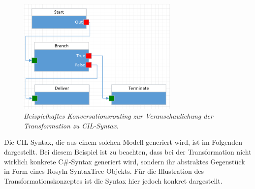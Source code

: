 \newpage

\begin{figure} %
	\centering
		\includegraphics[width=0.7\textwidth]{img/FlowToCodeExample.png}
	\caption[Beispielhaftes Konversationsrouting zur Veranschaulichung der Transformation zu CIL-Syntax]{\textit{Beispielhaftes Konversationsrouting zur Veranschaulichung der Transformation zu CIL-Syntax.}}
	\label{fig:FlowToCode}
\end{figure}
\noindent Die CIL-Syntax, die aus einem solchen Modell generiert wird, ist im Folgenden dargestellt. Bei diesem Beispiel ist zu beachten, dass bei der Transformation nicht wirklich konkrete C\#-Syntax generiert wird, sondern ihr abstraktes Gegenstück in Form eines Rosyln-SyntaxTree-Objekts. Für die Illustration des Transformationskonzeptes ist die Syntax hier jedoch konkret dargestellt.



